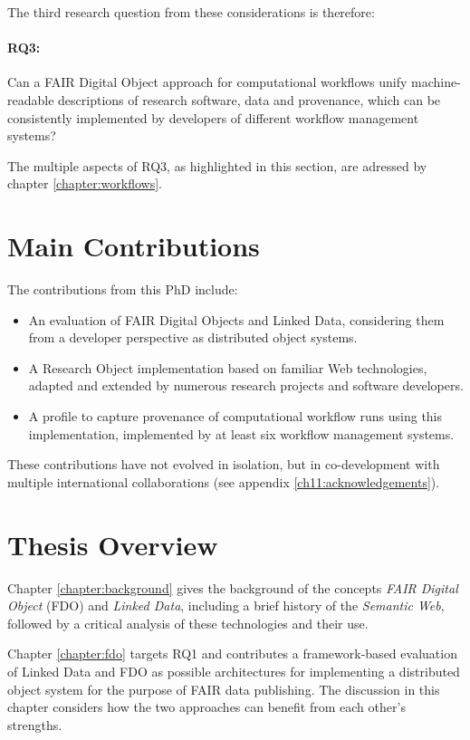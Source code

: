 The third research question from these considerations is therefore: 

\paragraph{RQ3:} \label{rq3} Can a FAIR Digital Object approach for computational workflows unify machine-readable descriptions of research software, data and provenance, which can be consistently implemented by developers of different workflow management systems?

The multiple aspects of RQ3, as highlighted in this section, are adressed by chapter \ref{chapter:workflows}.


\section{Main Contributions}
\label{intro:contributions}

The contributions from this PhD include:

\begin{itemize}
    \item An evaluation of FAIR Digital Objects and Linked Data, considering them from a developer perspective as distributed object systems.
    \item A Research Object implementation based on familiar Web technologies, adapted and extended by numerous research projects and software developers.
    \item A profile to capture provenance of computational workflow runs using this implementation, implemented by at least six workflow management systems.
\end{itemize}

These contributions have not evolved in isolation, but in co-development with multiple international collaborations (see appendix \vref{ch11:acknowledgements}).


\section{Thesis Overview}
\label{intro:overview}

Chapter \vref{chapter:background} gives the background of the concepts \emph{FAIR Digital Object} (FDO) and \emph{Linked Data}, including a brief history of the \emph{Semantic Web}, followed by a critical analysis of these technologies and their use. 

Chapter \vref{chapter:fdo} targets RQ1 and contributes a framework-based evaluation of Linked Data and FDO as possible architectures for implementing a distributed object system for the purpose of FAIR data publishing. The discussion in this chapter considers how the two approaches can benefit from each other's strengths. 

